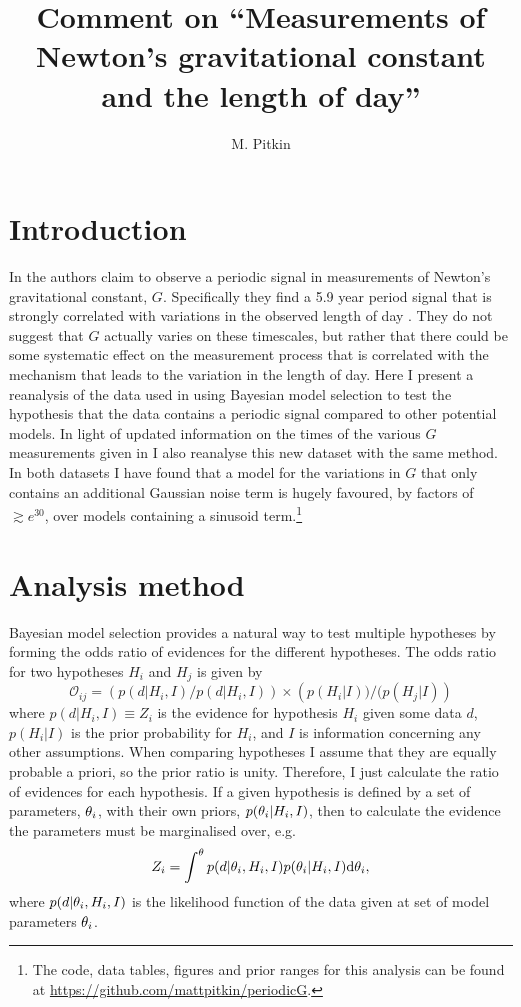 \documentclass[comment]{epl2}
\title{Comment on ``Measurements of Newton's gravitational constant and the length of day''}
\author{M. Pitkin}
\institute{
  SUPA, School of Physics \& Astronomy, University of Glasgow, Glasgow, G12 8QQ, UK
}
\begin{document}
\maketitle

\section{Introduction}

In \cite{2015EL....11010002A} the authors claim to observe a periodic signal in measurements of
Newton's gravitational constant, $G$. Specifically they find a 5.9 year period signal that
is strongly correlated with variations in the observed length of day
\cite{2013Natur.499..202H}. They do not suggest that $G$ actually varies on these
timescales, but rather that there could be some systematic effect on the measurement process that is
correlated with the mechanism that leads to the variation in the length of day.
Here I present a reanalysis of the data used in \cite{2015EL....11010002A}
using Bayesian model selection to test the hypothesis that the data contains
a periodic signal compared to other potential models. In light of updated information on the times
of the various $G$ measurements given in \cite{2015arXiv150501774S} I also reanalyse this new dataset with
the same method. In both datasets I have found that a model for the variations in $G$ that only contains an
additional Gaussian noise term is hugely favoured, by factors of $\gtrsim e^{30}$, over models containing
a sinusoid term.\footnote{The code, data tables, figures and prior ranges for this analysis can be
found at \url{https://github.com/mattpitkin/periodicG}.}

\section{Analysis method}

Bayesian model selection provides a natural way to test multiple hypotheses by forming the odds ratio of
evidences for the different hypotheses. The odds ratio for two hypotheses $H_i$ and $H_j$ is given by
\begin{equation}
 \mathcal{O}_{ij} = \left(p(d|H_i,I)/p(d|H_i,I)\right)\times\left(p(H_i|I))/(p(H_j|I)\right)
\end{equation}
where $p(d|H_i,I) \equiv Z_i$ is the evidence for hypothesis $H_i$ given some data $d$,
$p(H_i|I)$ is the prior probability for $H_i$, and $I$ is information concerning any other assumptions.
When comparing hypotheses I assume that they are equally
probable a priori, so the prior ratio is unity. Therefore, I just calculate
the ratio of evidences for each hypothesis. If a given hypothesis is defined
by a set of parameters, $\mathbf{\theta}_i$, with their own priors,
$p(\mathbf{\theta}_i|H_i,I)$, then to calculate the evidence the parameters must be marginalised
over, e.g.\
\begin{equation}\label{eq:evidence}
 Z_i = \int^{\mathbf{\theta}} p(d|\mathbf{\theta}_i,H_i,I) p(\mathbf{\theta}_i|H_i,I) {\rm d}\mathbf{\theta}_i,
\end{equation}
where $p(d|\mathbf{\theta}_i,H_i,I)$ is the likelihood function of the data given at set of model parameters $\mathbf{\theta}_i$.
\end{document}
